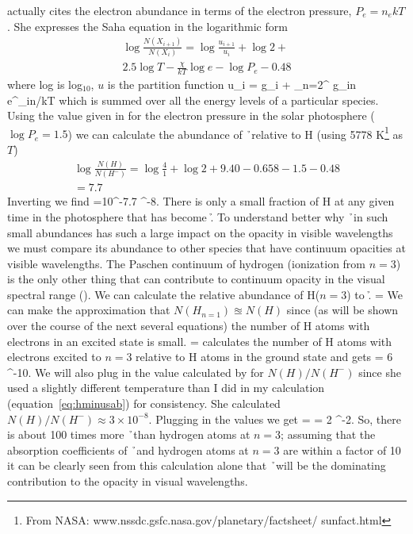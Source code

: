 \cite{boehm1989} actually cites the electron abundance in terms of the electron
pressure, $P_e=n_e kT$. She
expresses the Saha equation in the logarithmic form
\begin{multline}
\log \frac{N(X_{i+1})}{N(X_i)} = \log \frac{u_{i+1}}{u_i}+\log 2 +\\
 2.5 \log T - \frac{\chi}{kT}\log e - \log P_e - 0.48
\end{multline}
where log is log$_{10}$, $u$ is the partition function
\beq
u_i = g_i + \sum\limits_{n=2}^{\infty} g_{in} e^{\chi_{in}/kT}
\eeq
which is summed over all the energy levels of a particular species.
Using the value given in \cite{boehm1989} for the electron pressure in
the solar photosphere 
($\log P_e = 1.5$) we can calculate the abundance of \h\ relative to H
(using 5778 K\footnote{From NASA: www.nssdc.gsfc.nasa.gov/planetary/factsheet/ sunfact.html} as $T$)
\begin{multline}
\log \frac{N(H)}{N(H^-)} = \log \frac{4}{1} + \log 2 + 9.40 - 0.658  -
1.5 - 0.48\\ = 7.7
\end{multline}
Inverting we find 
\beq
\label{eq:hminusab}
=10^{-7.7}  ^{-8}.
\eeq
There is only a small fraction of H at any given time in the
photosphere that has become \h.  To understand better why \h\ in such
small abundances has such a large impact on the opacity in visible
wavelengths we must compare its abundance to other species that have
continuum opacities at visible wavelengths.  The Paschen continuum of
hydrogen (ionization from $n=3$) is the only other thing that can contribute
to continuum opacity in the visual spectral range
(\citealt{boehm1989}).  
We can calculate the relative abundance of H($n=3$) to \h.
\beq
  = 
\eeq
We can make the approximation that $N(H_{n=1})\approxeq N(H)$ since (as will be shown over the course of the next several equations) the number of H atoms with electrons in an excited state is small.
\beq
  = 
\eeq
\cite{boehm1989} calculates the number of H atoms with electrons excited to $n=3$ relative to H atoms in the ground state and gets
\beq
{} = 6  ^{-10}.
\eeq
We will also plug in the value calculated by \cite{boehm1989} for $N(H)/N(H^-)$ since she used a slightly different temperature than I did in my calculation (equation~\ref{eq:hminusab}) for consistency.  She calculated $N(H)/N(H^-) \approx 3 \times 10^{-8}$.  Plugging in the values we get
\beq
{} =  = 2 ^{-2}.
\eeq
So, there is about 100 times more \h\ than hydrogen atoms at $n=3$;
assuming that the absorption coefficients of \h\ and  hydrogen atoms
at $n=3$ are within a factor of 10 it can be clearly seen from this
calculation alone that \h\ will be the dominating contribution to the
opacity in visual wavelengths.

